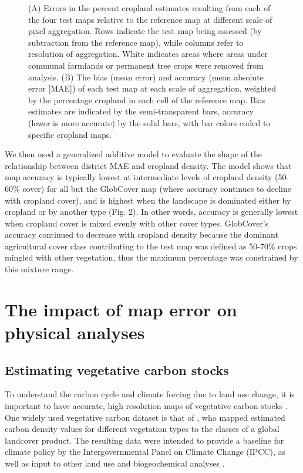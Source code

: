\documentclass{pnastwo}
\begin{document}
\begin{article}
\begin{figure}[hb]
\vspace{-0.15 cm}
\caption{(A) Errors in the percent cropland estimates resulting from each of the four test maps relative to the reference map at different scale of pixel aggregation. Rows indicate the test map being assessed (by subtraction from the reference map), while columns refer to resolution of aggregation. White indicates areas where areas under communal farmlands or permanent tree crops were removed from analysis. (B) The bias (mean error) and accuracy (mean absolute error [MAE]) of each test map at each scale of aggregation, weighted by the percentage cropland in each cell of the reference map. Bias estimates are indicated by the semi-transparent bars, accuracy (lower is more accurate) by the solid bars, with bar colors coded to specific cropland maps.}
\label{afoto1}
\end{figure}

We then used a generalized additive model to evaluate the shape of the relationship between district MAE and cropland density. The model shows that map accuracy is typically lowest at intermediate levels of cropland density (50-60\% cover) for all but the GlobCover map (where accuracy continues to decline with cropland cover), and is highest when the landscape is dominated either by cropland or by another type (Fig. 2). In other words, accuracy is generally lowest when cropland cover is mixed evenly with other cover types. GlobCover's accuracy continued to decrease with cropland density because the dominant agricultural cover class contributing to the test map was defined as 50-70\% crops mingled with other vegetation, thus the maximum percentage was constrained by this mixture range.  

\section{The impact of map error on physical analyses}
\subsection{Estimating vegetative carbon stocks}
To understand the carbon cycle and climate forcing due to land use change, it is important to have accurate, high resolution maps of vegetative carbon stocks \cite[][]{searchinger_high_2015}. One widely used vegetative carbon dataset is that of \cite{ruesch_new_2008}, who mapped estimated carbon density values for different vegetation types to the classes of a global landcover product. The resulting data were intended to provide a baseline for climate policy by the Intergovernmental Panel on Climate Change (IPCC), as well as input to other land use and biogeochemical analyses \cite{ruesch_new_2008}. 


\end{article}
\end{document}
